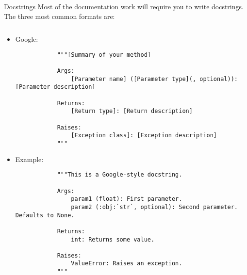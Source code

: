 \begin{frame}[fragile]{Docstrings}
  Most of the documentation work will require you to write docstrings. The three most common
  formats are:
  \begin{columns}[t, onlytextwidth]
    \begin{column}{0.78\textwidth}
      \begin{itemize}
        \item Google:
          \begin{verbatim}
            """[Summary of your method]

            Args:
                [Parameter name] ([Parameter type](, optional)): [Parameter description]

            Returns:
                [Return type]: [Return description]

            Raises:
                [Exception class]: [Exception description]
            """
          \end{verbatim}

        \item Example:
          \begin{verbatim}
            """This is a Google-style docstring.

            Args:
                param1 (float): First parameter.
                param2 (:obj:`str`, optional): Second parameter. Defaults to None.

            Returns:
                int: Returns some value.

            Raises:
                ValueError: Raises an exception.
            """
          \end{verbatim}
      \end{itemize}
    \end{column}
    \hfill
    \begin{column}{0.2\textwidth}
    \end{column}
  \end{columns}
\end{frame}
